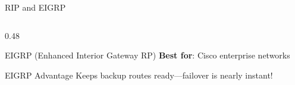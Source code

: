 \documentclass[aspectratio=169]{beamer}  %
\begin{document}
\begin{frame}{RIP and EIGRP}
\begin{columns}[T]
\begin{column}{0.48\textwidth}
\begin{block}{EIGRP (Enhanced Interior Gateway RP)}
                \vspace{0.2em}
                \textbf{Best for}: Cisco enterprise networks
            \end{block}
            
            \vspace{0.2em}
            \begin{exampleblock}{EIGRP Advantage}
                \small
                Keeps backup routes ready---failover is nearly instant!
            \end{exampleblock}
        \end{column}
    \end{columns}
\end{frame}

\end{document}

